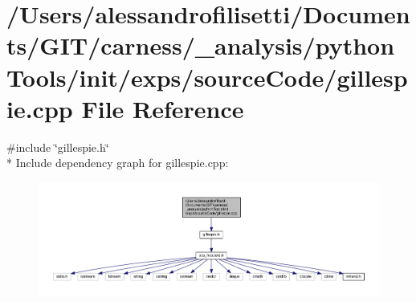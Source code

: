 \hypertarget{a00064}{\section{/\+Users/alessandrofilisetti/\+Documents/\+G\+I\+T/carness/\+\_\+analysis/python\+Tools/init/exps/source\+Code/gillespie.cpp File Reference}
\label{a00064}
}
{\ttfamily \#include \char`\"{}gillespie.\+h\char`\"{}}\\*
Include dependency graph for gillespie.\+cpp\+:\nopagebreak
\begin{figure}[H]
\begin{center}
\leavevmode
\includegraphics[width=350pt]{a00184}
\end{center}
\end{figure}
